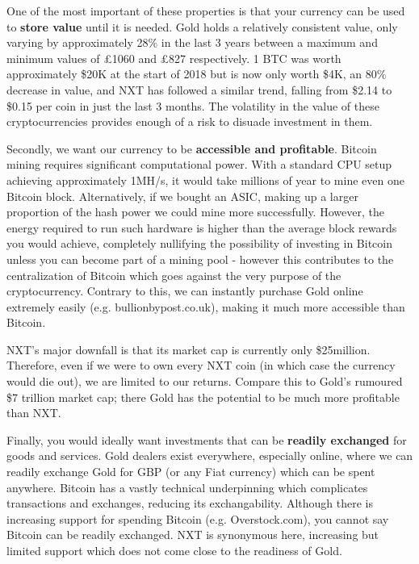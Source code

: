 \documentclass[11pt]{article}
\begin{document}
	One of the most important of these properties is that your currency can be used to \textbf{store value} until it is needed. Gold holds a relatively consistent value, only varying by approximately 28\% in the last 3 years between a maximum and minimum values of \pounds 1060 and \pounds 827 respectively. 1 BTC was worth approximately \$20K at the start of 2018 but is now only worth \$4K, an 80\% decrease in value, and NXT has followed a similar trend, falling from \$2.14 to \$0.15 per coin in just the last 3 months. The volatility in the value of these cryptocurrencies provides enough of a risk to disuade investment in them. \newline
	
	Secondly, we want our currency to be \textbf{accessible and profitable}. Bitcoin mining requires significant computational power. With a standard CPU setup achieving approximately 1MH/s, it would take millions of year to mine even one Bitcoin block. Alternatively, if we bought an ASIC, making up a larger proportion of the hash power we could mine more successfully. However, the energy required to run such hardware is higher than the average block rewards you would achieve, completely nullifying the possibility of investing in Bitcoin unless you can become part of a mining pool - however this contributes to the centralization of Bitcoin which goes against the very purpose of the cryptocurrency. Contrary to this, we can instantly purchase Gold online extremely easily (e.g. bullionbypost.co.uk), making it much more accessible than Bitcoin. 
	
	NXT's major downfall is that its market cap is currently only \$25million. Therefore, even if we were to own every NXT coin (in which case the currency would die out), we are limited to our returns. Compare this to Gold's rumoured \$7 trillion market cap; there Gold has the potential to be much more profitable than NXT. \newline
	
	Finally, you would ideally want investments that can be \textbf{readily exchanged} for goods and services. Gold dealers exist everywhere, especially online, where we can readily exchange Gold for GBP (or any Fiat currency) which can be spent anywhere. Bitcoin has a vastly technical underpinning which complicates transactions and exchanges, reducing its exchangability. Although there is increasing support for spending Bitcoin (e.g. Overstock.com), you cannot say Bitcoin can be readily exchanged. NXT is synonymous here, increasing but limited support which does not come close to the readiness of Gold. \newline
	
\end{document}
